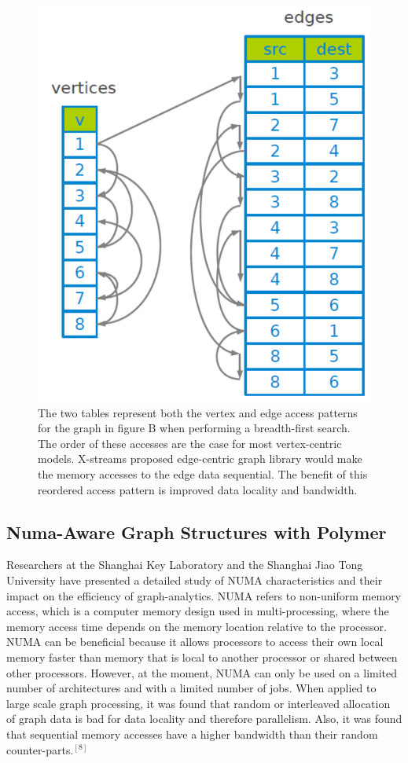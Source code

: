 \documentclass[conference]{IEEEtran}
\begin{document}
\begin{figure}
\includegraphics[scale=0.45]{figures/nodes_order.png}
\caption{The two tables represent both the vertex and edge access patterns for the graph in figure B when performing a breadth-first search.  The order of these accesses are the case for most vertex-centric models.  X-streams proposed edge-centric graph library would make the memory accesses to the edge data sequential.  The benefit of this reordered access pattern is improved data locality and bandwidth.  }
\end{figure}

\subsection{Numa-Aware Graph Structures with Polymer}

Researchers at the Shanghai Key Laboratory and the Shanghai Jiao Tong University have presented a detailed study of NUMA characteristics and their impact on the efficiency of graph-analytics.  NUMA refers to non-uniform memory access, which is a computer memory design used in multi-processing, where the memory access time depends on the memory location relative to the processor.  NUMA can be beneficial because it allows processors to access their own local memory faster than memory that is local to another processor or shared between other processors.  However, at the moment, NUMA can only be used on a limited number of architectures and with a limited number of jobs.  When applied to large scale graph processing, it was found that random or interleaved allocation of graph data is bad for data locality and therefore parallelism.  Also, it was found that sequential memory accesses have a higher bandwidth than their random counter-parts.$^{[8]}$  
\end{document}
